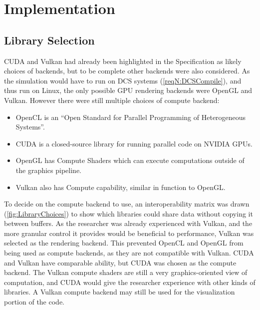 
\chapter{Implementation}
\label{sec:Implementation} 

\section{Library Selection}
\label{sec:LibrarySelection}

CUDA and Vulkan had already been highlighted in the Specification as likely choices of backends, but to be complete other backends were also considered.
As the simulation would have to run on DCS systems (\cref{reqN:DCSCompile}), and thus run on Linux, the only possible GPU rendering backends were OpenGL and Vulkan.
However there were still multiple choices of compute backend:
\begin{itemize}
    \item OpenCL\cite{tool:OpenCL1.0PressRelease} is an ``Open Standard for Parallel Programming of Heterogeneous Systems''\cite{TheKhronosGroupOpenCLInc}.
    \item CUDA\cite{tool:CUDA} is a closed-source library for running parallel code on NVIDIA GPUs.
    \item OpenGL has Compute Shaders\cite{tool:OpenGLComputeShaderExt} which can execute computations outside of the graphics pipeline.
    \item Vulkan also has Compute capability\cite{KhronosVulkanGuide}, similar in function to OpenGL.
\end{itemize}
To decide on the compute backend to use, an interoperability matrix was drawn (\cref{fig:LibraryChoices}) to show which libraries could share data without copying it between buffers.
As the researcher was already experienced with Vulkan, and the more granular control it provides would be beneficial to performance, Vulkan was selected as the rendering backend.
This prevented OpenCL and OpenGL from being used as compute backends, as they are not compatible with Vulkan.
CUDA and Vulkan have comparable ability, but CUDA was chosen as the compute backend.
The Vulkan compute shaders are still a very graphics-oriented view of computation, and CUDA would give the researcher experience with other kinds of libraries.
A Vulkan compute backend may still be used for the visualization portion of the code.


